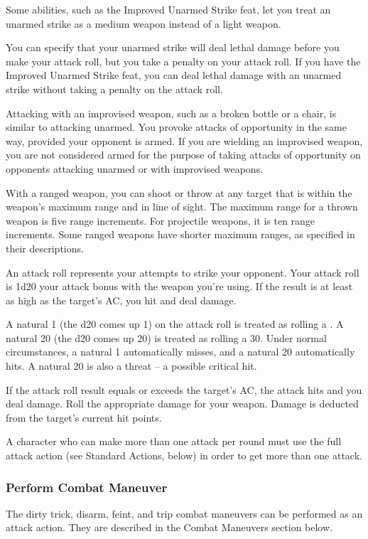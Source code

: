 \par Some abilities, such as the Improved Unarmed Strike feat, let you treat an unarmed strike as a medium weapon instead of a light weapon.

 You can specify that your unarmed strike will deal lethal damage before you make your attack roll, but you take a  penalty on your attack roll. If you have the Improved Unarmed Strike feat, you can deal lethal damage with an unarmed strike without taking a penalty on the attack roll.

 Attacking with an improvised weapon, such as a broken bottle or a chair, is similar to attacking unarmed. You provoke attacks of opportunity in the same way, provided your opponent is armed. If you are wielding an improvised weapon, you are not considered armed for the purpose of taking attacks of opportunity on opponents attacking unarmed or with improvised weapons.

 With a ranged weapon, you can shoot or throw at any target that is within the weapon's maximum range and in line of sight. The maximum range for a thrown weapon is five range increments. For projectile weapons, it is ten range increments. Some ranged weapons have shorter maximum ranges, as specified in their descriptions.

 An attack roll represents your attempts to strike your opponent.
Your attack roll is 1d20 \add your attack bonus with the weapon you're using. If the result is at least as high as the target's AC, you hit and deal damage.

 A natural 1 (the d20 comes up 1) on the attack roll is treated as rolling a . A natural 20 (the d20 comes up 20) is treated as rolling a 30. Under normal circumstances, a natural 1 automatically misses, and a natural 20 automatically hits. A natural 20 is also a threat -- a possible critical hit.

 If the attack roll result equals or exceeds the target's AC, the attack hits and you deal damage. Roll the appropriate damage for your weapon. Damage is deducted from the target's current hit points.

 A character who can make more than one attack per round must use the full attack action (see Standard Actions, below) in order to get more than one attack.

\subsubsection{Perform Combat Maneuver}
The dirty trick, disarm, feint, and trip combat maneuvers can be performed as an attack action. They are described in the Combat Maneuvers section below.

